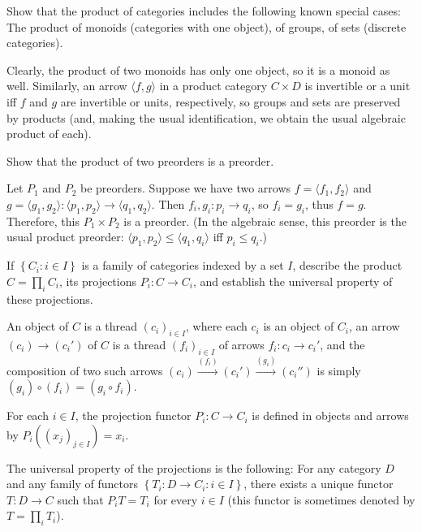 \begin{exercise}
Show that the product of categories includes the following known special cases: The product of monoids (categories with one object), of groups, of sets (discrete categories).
\end{exercise}
\begin{solution}
Clearly, the product of two monoids has only one object, so it is a monoid as well. Similarly, an arrow $\langle f,g\rangle$ in a product category $C\times D$ is invertible or a unit iff $f$ and $g$ are invertible or units, respectively, so groups and sets are preserved by products (and, making the usual identification, we obtain the usual algebraic product of each).
\end{solution}

\begin{exercise}
Show that the product of two preorders is a preorder.
\end{exercise}
\begin{solution}
Let $P_1$ and $P_2$ be preorders. Suppose we have two arrows $f=\langle f_1,f_2\rangle$ and $g=\langle g_1, g_2\rangle:\langle p_1,p_2\rangle\to\langle q_1,q_2\rangle$. Then $f_i,g_i:p_i\to q_i$, so $f_i=g_i$, thus $f=g$. Therefore, this $P_1\times P_2$ is a preorder. (In the algebraic sense, this preorder is the usual product preorder: $\langle p_1,p_2\rangle\leq\langle q_1,q_i\rangle$ iff $p_i\leq q_i$.)
\end{solution}

\begin{exercise}
If $\left\{C_i:i\in I\right\}$ is a family of categories indexed by a set $I$, describe the product $C=\prod_i C_i$, its projections $P_i:C\to C_i$, and establish the universal property of these projections.
\end{exercise}
\begin{solution}
An object of $C$ is a thread $(c_i)_{i\in I}$, where each $c_i$ is an object of $C_i$, an arrow $(c_i)\to (c_i')$ of $C$ is a thread $(f_i)_{i\in I}$ of arrows $f_i:c_i\to c_i'$, and the composition of two such arrows $(c_i)\overset{(f_i)}{\to}(c_i')\overset{(g_i)}{\to}(c_i'')$ is simply $(g_i)\circ(f_i)=(g_i\circ f_i)$.

For each $i\in I$, the projection functor $P_i:C\to C_i$ is defined in objects and arrows by $P_i((x_j)_{j\in I})=x_i$.

The universal property of the projections is the following: For any category $D$ and any family of functors $\left\{T_i:D\to C_i:i\in I\right\}$, there exists a unique functor $T:D\to C$ such that $P_i T=T_i$ for every $i\in I$ (this functor is sometimes denoted by $T=\prod_i T_i$).
\end{solution}

